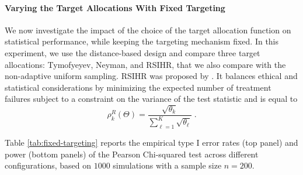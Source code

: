 

\paragraph*{Varying the Target Allocations With Fixed Targeting}

We now investigate the impact of the choice of the target allocation function on statistical performance, while keeping the targeting mechanism fixed. In this experiment, we use the distance-based design and compare three target allocations: Tymofyeyev, Neyman, and RSIHR, that we also compare with the non-adaptive uniform sampling. RSIHR was proposed by
\cite{Rosenberger01Opt}. It balances ethical and statistical considerations by
minimizing the expected number of treatment failures subject to a constraint
on the variance of the test statistic and is equal to
\[\rho_k^R(\Theta) = \frac{\sqrt{\theta_k}}{\sum_{\ell=1}^{K}\sqrt{\theta_{\ell}}}\;.\]

Table \ref{tab:fixed-targeting} reports the empirical type I error rates (top panel) and power (bottom panels) of the Pearson Chi-squared test across different configurations, based on $1000$ simulations with a sample size $n=200$.

